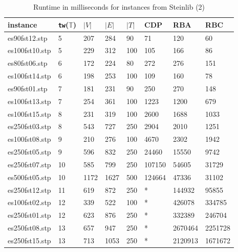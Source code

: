 \documentclass{llncs}
\begin{document}
\begin{table}[!h]
\begin{center}
\begin{tabular}{l l l l l | l l l }
\hline
instance & \texttt{tw}($\mathbb{T}$) & $|V|$ & $|E|$ & $|T|$ & CDP & RBA & RBC\\
\hline
\hline
es90fst12.stp	&	5	&	207	&	284	&	90	&	71	&	120	&	60	\\
es100fst10.stp	&	5	&	229	&	312	&	100	&	105	&	166	&	86	\\
es80fst06.stp	&	6	&	172	&	224	&	80	&	272	&	276	&	151	\\
es100fst14.stp	&	6	&	198	&	253	&	100	&	109	&	160	&	78	\\
es90fst01.stp	&	7	&	181	&	231	&	90	&	250	&	270	&	148	\\
es100fst13.stp	&	7	&	254	&	361	&	100	&	1223	&	1200	&	679	\\
es100fst15.stp	&	8	&	231	&	319	&	100	&	2600	&	1688	&	1033	\\
es250fst03.stp	&	8	&	543	&	727	&	250	&	2904	&	2010	&	1251	\\
es100fst08.stp	&	9	&	210	&	276	&	100	&	4670	&	2302	&	1942	\\
es250fst05.stp	&	9	&	596	&	832	&	250	&	24460	&	15550	&	9742	\\
es250fst07.stp	&	10	&	585	&	799	&	250	&	107150	&	54605	&	31729	\\
es500fst05.stp	&	10	&	1172	&	1627	&	500	&	124664	&	47336	&	31102	\\
es250fst12.stp	&	11	&	619 	&	872	&	250	&	*	&	144932 & 	95855\\
es100fst02.stp	&	12	&	339	&	522	&	100	&	*	&	426078 &	334785\\
es250fst01.stp	&	12	&	623	&	876	&	250	&	*	&	332389 & 	246704\\
es250fst08.stp	&	13	&	657	&	947	&	250	&	*	&	2670464 &	2251728\\
es250fst15.stp	&	13	&	713	&	1053	&	250	&	*	&	2120913 &	1671672\\
\hline
\end{tabular}
\end{center}
\caption{Runtime in milliseconds for instances from Steinlib (2)}
\label{t1:b}
\end{table}
\end{document}
